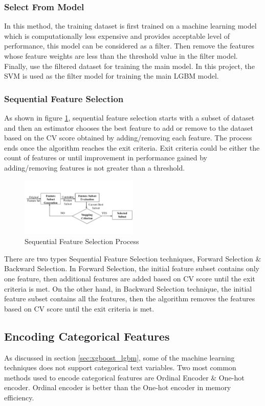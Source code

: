 \documentclass[twoside,11pt,a4paper]{article}
\begin{document}
\subsubsection{Select From Model}
In this method, the training dataset is first trained on a machine learning model which is computationally less expensive and provides acceptable level of performance, this model can be considered as a filter. Then remove the features whose feature weights are less than the threshold value in the filter model. Finally, use the filtered dataset for training the main model. In this project, the \acs{SVM} is used as the filter model for training the main \acs{LGBM} model.
\subsubsection{Sequential Feature Selection}
As shown in figure \ref{fig:seq_feature_selection}, sequential feature selection starts with a subset of dataset and then an estimator chooses the best feature to add or remove to the dataset based on the \acf{CV} score obtained by adding/removing each feature. The process ends once the algorithm reaches the exit criteria. Exit criteria could be either the count of features or until improvement in performance gained by adding/removing features is not greater than a threshold.
\begin{figure}[ht]
	\centering
	\includegraphics[width=0.5\textwidth]{seq_feature_selection}
	\caption[Sequential Feature Selection Flowchart]{Sequential Feature Selection Process\citep{beyan2015detection}}
	\label{fig:seq_feature_selection}
\end{figure}
There are two types Sequential Feature Selection techniques, Forward Selection \& Backward Selection. In Forward Selection, the initial feature subset contains only one feature, then additional features are added based on \acs{CV} score until the exit criteria is met. On the other hand, in Backward Selection technique, the initial feature subset contains all the features, then the algorithm removes the features based on \acs{CV} score until the exit criteria is met. 
\subsection{Encoding Categorical Features}
As discussed in section \ref{sec:xgboost_lgbm}, some of the machine learning techniques does not support categorical text variables. Two most common methods used to encode categorical features are Ordinal Encoder \& One-hot encoder. Ordinal encoder is better than the One-hot encoder in memory efficiency.
\end{document}
